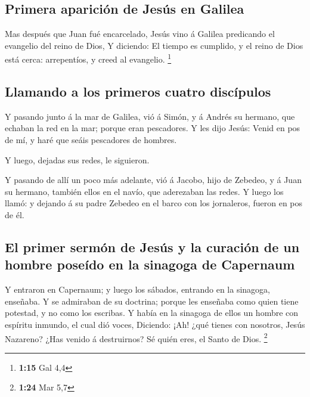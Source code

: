 \hypertarget{primera-apariciuxf3n-de-jesuxfas-en-galilea}{%
\subsection{Primera aparición de Jesús en
Galilea}\label{primera-apariciuxf3n-de-jesuxfas-en-galilea}}

 Mas después que Juan fué encarcelado, Jesús vino á Galilea
predicando el evangelio del reino de Dios,  Y diciendo: El
tiempo es cumplido, y el reino de Dios está cerca: arrepentíos, y creed
al evangelio. \footnote{\textbf{1:15} Gal 4,4}

\hypertarget{llamando-a-los-primeros-cuatro-discuxedpulos}{%
\subsection{Llamando a los primeros cuatro
discípulos}\label{llamando-a-los-primeros-cuatro-discuxedpulos}}

 Y pasando junto á la mar de Galilea, vió á Simón, y á
Andrés su hermano, que echaban la red en la mar; porque eran pescadores.
 Y les dijo Jesús: Venid en pos de mí, y haré que seáis
pescadores de hombres.

 Y luego, dejadas sus redes, le siguieron.

 Y pasando de allí un poco más adelante, vió á Jacobo, hijo
de Zebedeo, y á Juan su hermano, también ellos en el navío, que
aderezaban las redes.  Y luego los llamó: y dejando á su
padre Zebedeo en el barco con los jornaleros, fueron en pos de él.

\hypertarget{el-primer-sermuxf3n-de-jesuxfas-y-la-curaciuxf3n-de-un-hombre-poseuxeddo-en-la-sinagoga-de-capernaum}{%
\subsection{El primer sermón de Jesús y la curación de un hombre poseído
en la sinagoga de
Capernaum}\label{el-primer-sermuxf3n-de-jesuxfas-y-la-curaciuxf3n-de-un-hombre-poseuxeddo-en-la-sinagoga-de-capernaum}}

 Y entraron en Capernaum; y luego los sábados, entrando en
la sinagoga, enseñaba.  Y se admiraban de su doctrina;
porque les enseñaba como quien tiene potestad, y no como los escribas.
 Y había en la sinagoga de ellos un hombre con espíritu
inmundo, el cual dió voces,  Diciendo: ¡Ah! ¿qué tienes con
nosotros, Jesús Nazareno? ¿Has venido á destruirnos? Sé quién eres, el
Santo de Dios. \footnote{\textbf{1:24} Mar 5,7}

